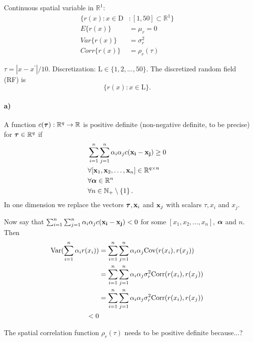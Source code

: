 Continuous spatial variable in $\mathbb{R}^1$: 
\begin{align*}
    \{r(x): x \in \text{D} &: [1,50] \subset \mathbb{R}^1\} \\
    E\{r(x)\} &= \mu_r = 0\\
    Var\{r(x)\} & = \sigma_r^2 \\
    Corr\{r(x)\} & = \rho_r(\tau)
\end{align*}

$\tau = |x-x^\prime|/10.$ 
Discretization: $\text{L} \in \{1,2,...,50\}$.
The discretized random field (RF) is 
\begin{equation*}
    \{r(x): x \in \text{L}\}.
\end{equation*}

\paragraph{a)}
A function $c(\boldsymbol{\mathbf{\tau}}) : \mathbb{R}^q \rightarrow \mathbb{R}$ is positive definite (non-negative definite, to be precise) for $\boldsymbol{\mathbf{\tau}} \in \mathbb{R}^q$ if
%
\begin{equation*}
\begin{split}
    & \sum_{i=1}^n \sum_{j=1}^n \alpha_i \alpha_j c(\boldsymbol{\mathbf{x_i}} - \boldsymbol{\mathbf{x_j}}) \geq 0 \\
    & \forall [\boldsymbol{\mathbf{x}}_1, \boldsymbol{\mathbf{x}}_2, \dots, \boldsymbol{\mathbf{x}}_n] \in \mathbb{R}^{q \times n} \\
    & \forall \boldsymbol{\mathbf{\alpha}} \in \mathbb{R}^n \\
    & \forall n \in \mathbb{N}_+ \setminus \{1\} \, .
\end{split}
\end{equation*}
%
In one dimension we replace the vectors $\boldsymbol{\mathbf{\tau}}, \boldsymbol{\mathbf{x}}_i$ and $\boldsymbol{\mathbf{x}}_j$ with scalars $\tau, x_i$ and $x_j$.

Now say that $\sum_{i=1}^n \sum_{j=1}^n \alpha_i \alpha_j c(\boldsymbol{\mathbf{x_i}} - \boldsymbol{\mathbf{x_j}}) < 0$ for some $[x_1, x_2, \dots, x_n]$, $\boldsymbol{\mathbf{\alpha}}$ and $n$. Then
%
\begin{align*}
    \mathrm{Var}(\sum_{i=1}^n \alpha_i r(x_i)) 
    &= \sum_{i=1}^n \sum_{j=1}^n \alpha_i \alpha_j \mathrm{Cov}(r(x_i), r(x_j)) \\
    &= \sum_{i=1}^n \sum_{j=1}^n \alpha_i \alpha_j \sigma^2_r \mathrm{Corr}(r(x_i), r(x_j)) \\
     &= \sum_{i=1}^n \sum_{j=1}^n \alpha_i \alpha_j \sigma^2_r \mathrm{Corr}(r(x_i), r(x_j)) \\
    < 0
\end{align*}

The spatial correlation function $\rho_r(\tau)$ needs to be positive definite because...?

